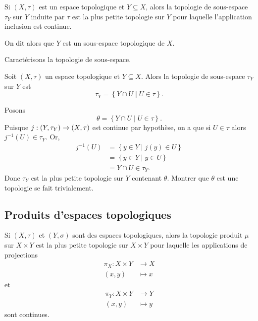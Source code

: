 \documentclass[french]{article}
\begin{document}
\begin{definition}
  Si $(X, \tau)$ est un espace topologique et $Y \subseteq X$, alors la topologie de sous-espace $\tau_Y$ sur $Y$ induite par  $\tau$ est la plus petite topologie sur $Y$ pour laquelle l'application inclusion est continue. 
  \par On dit alors que $Y$ est un sous-espace topologique de $X$.
\end{definition}
Caractérisons la topologie de sous-espace.
\begin{lemme}
  Soit $(X, \tau)$ un espace topologique et $Y \subseteq X$. Alors la topologie de sous-espace $\tau_Y$ sur  $Y$ est
  $$\tau_Y = \left\{ Y \cap U \mid U \in \tau \right\}.$$

  \tcblower
  \begin{preuve}
    Posons $$\theta = \left\{ Y \cap U \mid U \in \tau \right\}.$$ Puisque $j: (Y, \tau_Y) \rightarrow (X, \tau)$ est continue par hypothèse, on a que si  $U \in \tau$ alors $j^{-1}(U) \in \tau_Y$. Or,
    \begin{align*}
      j^{-1}(U) &= \left\{ y \in Y \mid j(y) \in U \right\} \\
                &= \left\{ y \in Y \mid y \in U \right\} \\
                &= Y \cap U \in \tau_Y.
    \end{align*}
    Donc $\tau_Y$ est la plus petite topologie sur $Y$ contenant $\theta$. Montrer que $\theta$ est une topologie se fait trivialement.
  \end{preuve}
\end{lemme}

\subsection{Produits d'espaces topologiques}
\begin{definition}
  Si $(X, \tau)$ et  $(Y, \sigma)$ sont des espaces topologiques, alors la topologie produit $\mu$ sur  $X \times Y$ est la plus petite topologie sur $X \times Y$ pour laquelle les applications de projections
  \begin{align*}
    \pi_X: X \times Y &\longrightarrow X \\
    (x, y)&\longmapsto x
  \end{align*}
  et
  \begin{align*}
    \pi_Y: X \times Y &\longrightarrow Y \\
    (x, y)&\longmapsto y
  \end{align*}
  sont continues.
\end{definition}
\end{document}
